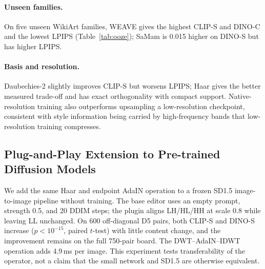 \documentclass[letterpaper]{article}
\begin{document}
\paragraph{Unseen families.}
On five unseen WikiArt families, WEAVE gives the highest CLIP-S and DINO-C and the lowest
LPIPS (Table~\ref{tab:ooze}); SaMam is 0.015 higher on DINO-S but has higher LPIPS.
\begin{table}[ht]
\centering
\small
{}
\caption{Zero-shot evaluation on Other5 (750 pairs) using the D5 checkpoint.}
\label{tab:ooze}
\end{table}

\paragraph{Basis and resolution.}
Daubechies-2 slightly improves CLIP-S but worsens LPIPS; Haar gives the better measured trade-off and has exact orthogonality with compact support. Native-resolution training also outperforms upsampling a low-resolution checkpoint, consistent with style information being carried by high-frequency bands that low-resolution training compresses.


\subsection{Plug-and-Play Extension to Pre-trained Diffusion Models}
\label{sec:plugin}

We add the same Haar and endpoint AdaIN operation to a frozen SD1.5 image-to-image pipeline without training. The base editor uses an empty prompt, strength 0.5, and 20 DDIM steps; the plugin aligns LH/HL/HH at scale 0.8 while leaving LL unchanged. On 600 off-diagonal D5 pairs, both CLIP-S and DINO-S increase ($p{<}10^{-15}$, paired $t$-test) with little content change, and the improvement remains on the full 750-pair board. The DWT--AdaIN--IDWT operation adds 4.9\,ms per image. This experiment tests transferability of the operator, not a claim that the small network and SD1.5 are otherwise equivalent.
\end{document}
